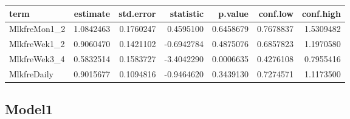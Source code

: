 \documentclass[]{article}
\newenvironment{Shaded}{\begin{snugshade}}{\end{snugshade}}
\newcommand{\DataTypeTok}[1]{\textcolor[rgb]{0.13,0.29,0.53}{#1}}
\newcommand{\KeywordTok}[1]{\textcolor[rgb]{0.13,0.29,0.53}{\textbf{#1}}}
\newcommand{\NormalTok}[1]{#1}
\newcommand{\OperatorTok}[1]{\textcolor[rgb]{0.81,0.36,0.00}{\textbf{#1}}}
\newcommand{\OtherTok}[1]{\textcolor[rgb]{0.56,0.35,0.01}{#1}}
\newcommand{\StringTok}[1]{\textcolor[rgb]{0.31,0.60,0.02}{#1}}
\begin{document}
\begin{Shaded}
\end{Shaded}

\begin{longtable}[]{@{}lrrrrrr@{}}
\toprule
term & estimate & std.error & statistic & p.value & conf.low &
conf.high\tabularnewline
\midrule
\endhead
MlkfreMon1\_2 & 1.0842463 & 0.1760247 & 0.4595100 & 0.6458679 &
0.7678837 & 1.5309482\tabularnewline
MlkfreWek1\_2 & 0.9060470 & 0.1421102 & -0.6942784 & 0.4875076 &
0.6857823 & 1.1970580\tabularnewline
MlkfreWek3\_4 & 0.5832514 & 0.1583727 & -3.4042290 & 0.0006635 &
0.4276108 & 0.7955416\tabularnewline
MlkfreDaily & 0.9015677 & 0.1094816 & -0.9464620 & 0.3439130 & 0.7274571
& 1.1173500\tabularnewline
\bottomrule
\end{longtable}

\hypertarget{model1-7}{%
\subsection{Model1}\label{model1-7}}

\begin{Shaded}
\end{Shaded}
\end{document}
